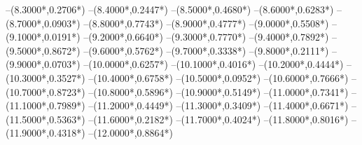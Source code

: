 {	--({8.3000*\dx},{0.2706*\dy})
	--({8.4000*\dx},{0.2447*\dy})
	--({8.5000*\dx},{0.4680*\dy})
	--({8.6000*\dx},{0.6283*\dy})
	--({8.7000*\dx},{0.0903*\dy})
	--({8.8000*\dx},{0.7743*\dy})
	--({8.9000*\dx},{0.4777*\dy})
	--({9.0000*\dx},{0.5508*\dy})
	--({9.1000*\dx},{0.0191*\dy})
	--({9.2000*\dx},{0.6640*\dy})
	--({9.3000*\dx},{0.7770*\dy})
	--({9.4000*\dx},{0.7892*\dy})
	--({9.5000*\dx},{0.8672*\dy})
	--({9.6000*\dx},{0.5762*\dy})
	--({9.7000*\dx},{0.3338*\dy})
	--({9.8000*\dx},{0.2111*\dy})
	--({9.9000*\dx},{0.0703*\dy})
	--({10.0000*\dx},{0.6257*\dy})
	--({10.1000*\dx},{0.4016*\dy})
	--({10.2000*\dx},{0.4444*\dy})
	--({10.3000*\dx},{0.3527*\dy})
	--({10.4000*\dx},{0.6758*\dy})
	--({10.5000*\dx},{0.0952*\dy})
	--({10.6000*\dx},{0.7666*\dy})
	--({10.7000*\dx},{0.8723*\dy})
	--({10.8000*\dx},{0.5896*\dy})
	--({10.9000*\dx},{0.5149*\dy})
	--({11.0000*\dx},{0.7341*\dy})
	--({11.1000*\dx},{0.7989*\dy})
	--({11.2000*\dx},{0.4449*\dy})
	--({11.3000*\dx},{0.3409*\dy})
	--({11.4000*\dx},{0.6671*\dy})
	--({11.5000*\dx},{0.5363*\dy})
	--({11.6000*\dx},{0.2182*\dy})
	--({11.7000*\dx},{0.4024*\dy})
	--({11.8000*\dx},{0.8016*\dy})
	--({11.9000*\dx},{0.4318*\dy})
	--({12.0000*\dx},{0.8864*\dy})
}
